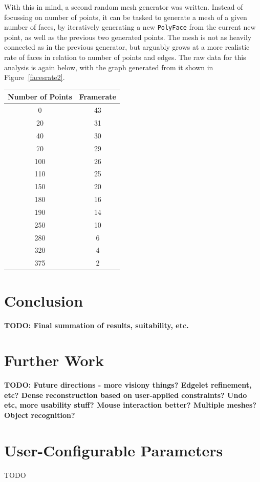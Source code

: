 \documentclass[a4paper,10pt]{article}
\begin{document}
With this in mind, a second random mesh generator was written. Instead of focussing on number of points, it can be tasked to generate a mesh of a given number of faces, by iteratively generating a new \texttt{PolyFace} from the current new point, as well as the previous two generated points. The mesh is not as heavily connected as in the previous generator, but arguably grows at a more realistic rate of faces in relation to number of points and edges. The raw data for this analysis is again below, with the graph generated from it shown in Figure~\ref{facesrate2}.

\begin{center}
\begin{tabular}{| c || c |} 
\hline
\textbf{Number of Points}	& \textbf{Framerate} \\
\hline
\hline
0	& 43 \\
20	& 31 \\
40	& 30 \\
70	& 29 \\
100	& 26 \\
110	& 25 \\
150	& 20 \\
180	& 16 \\
190	& 14 \\
250	& 10 \\
280	& 6 \\
320	& 4 \\
375	& 2 \\
\hline
\end{tabular}
\end{center}

\section{Conclusion}

\textbf{TODO: Final summation of results, suitability, etc.}

\section{Further Work}

\textbf{TODO: Future directions - more visiony things? Edgelet refinement, etc? Dense reconstruction based on user-applied constraints? Undo etc, more usability stuff? Mouse interaction better? Multiple meshes? Object recognition?}

\clearpage
\renewcommand*{\refname}{\section{References}}



\clearpage
\appendix
\section{User-Configurable Parameters}
\label{configparams}
TODO
\end{document}
